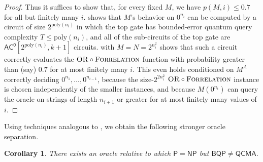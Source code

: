 \documentclass[10pt,a4paper]{article}
\newtheorem{corollary}[theorem]{Corollary}
\newcommand{\poly}{\mathrm{poly}}
\newcommand{\OR}{\normalfont\textsc{OR}}
\newcommand{\Forrelation}{\normalfont\textsc{Forrelation}}
\begin{document}
\begin{proof}
\noindent Thus it suffices to show that, for every fixed $M$, we have $p(M,i)\leq 0.7$ for all but finitely many $i$.  shows that $M$'s behavior on $0^{n_i}$ can be computed by a circuit of size $2^{\poly(n_i)}$ in which the top gate has bounded-error quantum query complexity $T \le \poly(n_i)$, and all of the sub-circuits of the top gate are $\mathsf{AC^0}\left[2^{\poly(n_i)}, k+1\right]$ circuits.  with $M = N = 2^{n_i^2}$ shows that such a circuit correctly evaluates the $\OR \circ \Forrelation$ function with probability greater than (say) $0.7$ for at most finitely many $i$. This even holds conditioned on $M^A$ correctly deciding $0^{n_1},\ldots,0^{n_{i-1}}$, because the size-$2^{2n_i^2}$ $\OR \circ \Forrelation$ instance is chosen independently of the smaller instances, and because $M\left(0^{n_i}\right)$ can query the oracle on strings of length $n_{i+1}$ or greater for at most finitely many values of $i$.
\end{proof}

Using techniques analogous to , we obtain the following stronger oracle separation.

\begin{corollary}
\label{cor:p=np_bqp!=qcma}
There exists an oracle relative to which $\mathsf{P} = \mathsf{NP}$ but $\mathsf{BQP} \neq \mathsf{QCMA}$.
\end{corollary}
\end{document}
